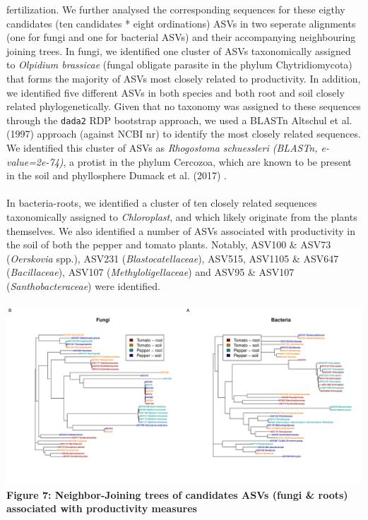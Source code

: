 \documentclass[11pt,]{article}
\begin{document}
fertilization. We further analysed the corresponding sequences for these
eigthy candidates (ten candidates * eight ordinations) ASVs in two
seperate alignments (one for fungi and one for bacterial ASVs) and their
accompanying neighbouring joining trees. In fungi, we identified one
cluster of ASVs taxonomically assigned to \emph{Olpidium brassicae}
(fungal obligate parasite in the phylum Chytridiomycota) that forms the
majority of ASVs most closely related to productivity. In addition, we
identified five different ASVs in both species and both root and soil
closely related phylogenetically. Given that no taxonomy was assigned to
these sequences through the \texttt{dada2} RDP bootstrap approach, we
used a BLASTn Altschul et al. (1997) approach (against NCBI nr) to
identify the most closely related sequences. We identified this cluster
of ASVs as \emph{Rhogostoma schuessleri (BLASTn, e-value=2e-74)}, a
protist in the phylum Cercozoa, which are known to be present in the
soil and phyllosphere Dumack et al. (2017) .\\
\hspace*{0.333em}\\
In bacteria-roots, we identified a cluster of ten closely related
sequences taxonomically assigned to \emph{Chloroplast}, and which likely
originate from the plants themselves. We also identified a number of
ASVs associated with productivity in the soil of both the pepper and
tomato plants. Notably, ASV100 \& ASV73 (\emph{Oerskovia} spp.), ASV231
(\emph{Blastocatellaceae}), ASV515, ASV1105 \& ASV647
(\emph{Bacillaceae}), ASV107 (\emph{Methyloligellaceae}) and ASV95 \&
ASV107 (\emph{Santhobacteraceae}) were identified. ~\\
\hspace*{0.333em}\\
\includegraphics{../figures/Figure7_candidateASVs.pdf}\\
\textbf{Figure 7: Neighbor-Joining trees of candidates ASVs (fungi \&
roots) associated with productivity measures} ~\\
\hspace*{0.333em}
\end{document}
